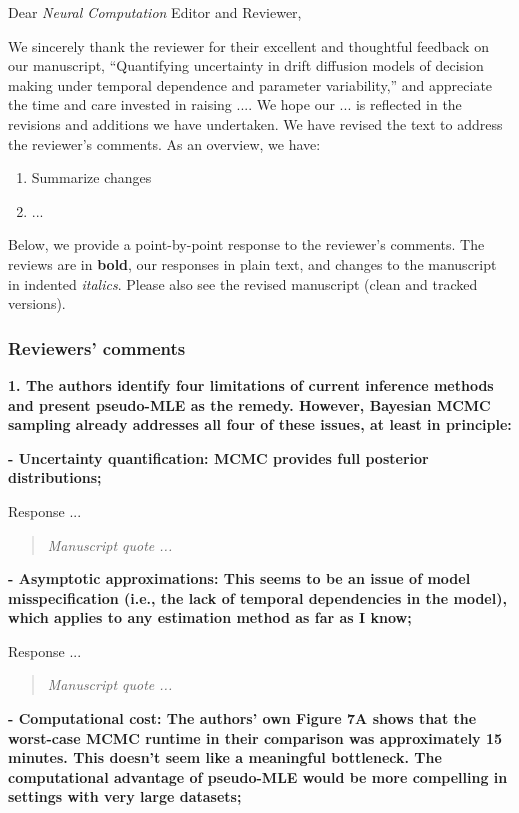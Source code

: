 \documentclass[00-main.tex]{subfiles}
\newcommand{\reviewercomment}[1]{\vspace{0.3cm}\noindent\textbf{#1}\vspace{0.15cm}}
\newcommand{\manuscriptquote}[1]{\begin{quote}\textit{#1}\end{quote}}
\begin{document}
Dear \emph{Neural Computation} Editor and Reviewer,

\vspace{0.5cm}

We sincerely thank the reviewer for their excellent and thoughtful feedback on our manuscript, ``Quantifying uncertainty in drift diffusion models of decision making
under temporal dependence and parameter variability,'' and appreciate the time and care invested in raising .... We hope our ... is reflected in the revisions and additions we have undertaken. We have revised the text to address the reviewer's comments. As an overview, we have:

\begin{enumerate}
    \item Summarize changes
    \item ...
\end{enumerate}

\vspace{0.5cm}

Below, we provide a point-by-point response to the reviewer's comments. The reviews are in \textbf{bold}, our responses in plain text, and changes to the manuscript in indented \textit{italics}. Please also see the revised manuscript (clean and tracked versions).

\subsubsection*{Reviewers' comments}

\reviewercomment{1. The authors identify four limitations of current inference methods and present pseudo-MLE as the remedy. However, Bayesian MCMC sampling already addresses all four of these issues, at least in principle:}

\reviewercomment{- Uncertainty quantification: MCMC provides full posterior distributions;}

Response ...

\manuscriptquote{Manuscript quote ...}

\reviewercomment{- Asymptotic approximations: This seems to be an issue of model misspecification (i.e., the lack of temporal dependencies in the model), which applies to any estimation method as far as I know;}

Response ...

\manuscriptquote{Manuscript quote ...}

\reviewercomment{- Computational cost: The authors' own Figure 7A shows that the worst-case MCMC runtime in their comparison was approximately 15 minutes. This doesn't seem like a meaningful bottleneck. The computational advantage of pseudo-MLE would be more compelling in settings with very large datasets;}
\end{document}
